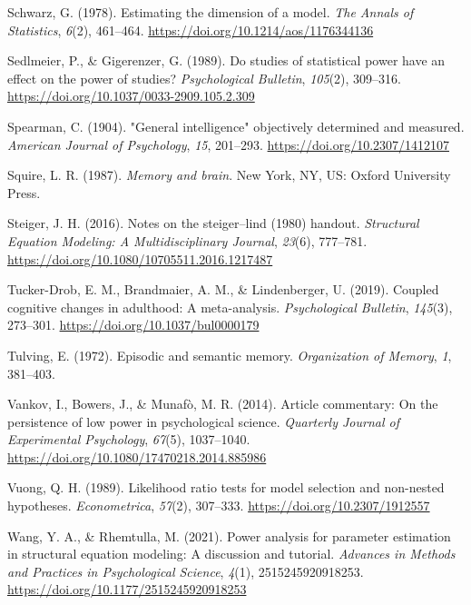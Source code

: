 \documentclass[
  man,floatsintext]{apa6}
\newlength{\cslhangindent}
\newlength{\cslentryspacingunit} %
\newenvironment{CSLReferences}[2] %
 {%
  \setlength{\parindent}{0pt}
  \ifodd #1
  \let\oldpar\par
  \def\par{\hangindent=\cslhangindent\oldpar}
  \fi
  \setlength{\parskip}{#2\cslentryspacingunit}
 }%
 {}
\begin{document}
\begin{CSLReferences}{1}{0}
\leavevmode{}%
Schwarz, G. (1978). Estimating the dimension of a model. \emph{The Annals of Statistics}, \emph{6}(2), 461--464. \url{https://doi.org/10.1214/aos/1176344136}

\leavevmode{}%
Sedlmeier, P., \& Gigerenzer, G. (1989). Do studies of statistical power have an effect on the power of studies? \emph{Psychological Bulletin}, \emph{105}(2), 309--316. \url{https://doi.org/10.1037/0033-2909.105.2.309}

\leavevmode{}%
Spearman, C. (1904). "General intelligence" objectively determined and measured. \emph{American Journal of Psychology}, \emph{15}, 201--293. \url{https://doi.org/10.2307/1412107}

\leavevmode{}%
Squire, L. R. (1987). \emph{Memory and brain}. New York, {NY}, {US}: Oxford University Press.

\leavevmode{}%
Steiger, J. H. (2016). Notes on the steiger--lind (1980) handout. \emph{Structural Equation Modeling: A Multidisciplinary Journal}, \emph{23}(6), 777--781. \url{https://doi.org/10.1080/10705511.2016.1217487}

\leavevmode{}%
Tucker-Drob, E. M., Brandmaier, A. M., \& Lindenberger, U. (2019). Coupled cognitive changes in adulthood: A meta-analysis. \emph{Psychological Bulletin}, \emph{145}(3), 273--301. \url{https://doi.org/10.1037/bul0000179}

\leavevmode{}%
Tulving, E. (1972). Episodic and semantic memory. \emph{Organization of Memory}, \emph{1}, 381--403.

\leavevmode{}%
Vankov, I., Bowers, J., \& Munafò, M. R. (2014). Article commentary: On the persistence of low power in psychological science. \emph{Quarterly Journal of Experimental Psychology}, \emph{67}(5), 1037--1040. \url{https://doi.org/10.1080/17470218.2014.885986}

\leavevmode{}%
Vuong, Q. H. (1989). Likelihood ratio tests for model selection and non-nested hypotheses. \emph{Econometrica}, \emph{57}(2), 307--333. \url{https://doi.org/10.2307/1912557}

\leavevmode{}%
Wang, Y. A., \& Rhemtulla, M. (2021). Power analysis for parameter estimation in structural equation modeling: A discussion and tutorial. \emph{Advances in Methods and Practices in Psychological Science}, \emph{4}(1), 2515245920918253. \url{https://doi.org/10.1177/2515245920918253}


\end{CSLReferences}
\end{document}
